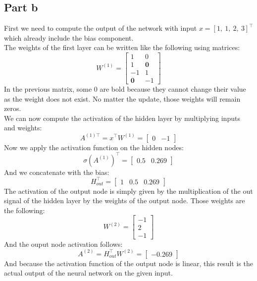 \documentclass[a4paper, 10pt]{article}
\begin{document}
\subsection{Part b}
First we need to compute the output of the network with input $x=[1,\ 1,\ 2,\ 3]^\top$ which already include the bias component.
\\
The weights of the first layer can be written like the following using matrices:
$$
W^{(1)} = \begin{bmatrix}
    1 & 0\\
    1 & \bm{0}\\
    -1 & 1\\
    \bm{0} & -1
\end{bmatrix} 
$$
In the previous matrix, some $0$ are bold because they cannot change their value as the weight does not exist.
No matter the update, those weights will remain zeros.
\\
We can now compute the activation of the hidden layer by multiplying inputs and weights:
$$
A^{(1)\top} = x^\top W^{(1)} = \begin{bmatrix}
    0 & -1
\end{bmatrix} 
$$
Now we apply the activation function on the hidden nodes:
$$
\sigma(A^{(1)})^\top = \begin{bmatrix}
    0.5 & 0.269
\end{bmatrix}
$$
And we concatenate with the bias:
$$
H_{out}^\top = \begin{bmatrix}
    1 & 0.5 & 0.269
\end{bmatrix}
$$
The activation of the output node is simply given by the multiplication of the out signal of the hidden layer by the weights of the 
output node. Those weights are the following:
$$
W^{(2)} = \begin{bmatrix}
    -1\\
    2\\
    -1
\end{bmatrix}
$$
And the ouput node activation follows:
$$
A^{(2)} = H_{out}^\top W^{(2)} = \begin{bmatrix}
    -0.269
\end{bmatrix}
$$
And because the activation function of the output node is linear, this result is the actual output of the neural network
on the given input.
\end{document}
